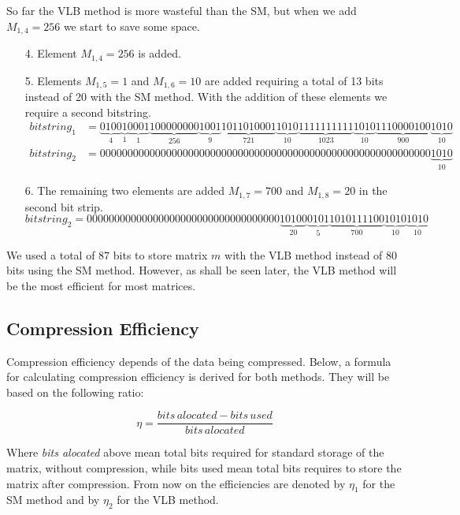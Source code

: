 \documentclass[10pt]{article}
\begin{document}
So far the VLB method is more wasteful than the SM, but when we add $M_{1,4} =256$  we start to save some space.

\begin{enumerate}
 \item[4.] Element $M_{1,4} =256$ is added.  
 \item [5.] Elements $M_{1,5} =1$ and $M_{1,6} =10$ are added requiring a total of 13 bits instead of 20 with the SM method. With the addition of these elements we require a second bitstring.
 \begin{align*} \label{eq:12}
 bitstring_1 &=
 \underbrace{0100}_{4}\underbrace{1}_{1}\underbrace{0001}_{1}\underbrace{100000000}_{256}\underbrace{1001}_{9}\underbrace{1011010001}_{721}\underbrace{1010}_{10}\underbrace{1111111111}_{1023}\underbrace{1010}_{10}\underbrace{1110000100}_{900}\underbrace{1010}_{10} \\
 bitstring_2 &= 000000000000000000000000000000000000000000000000000000000000\underbrace{1010}_{10}
\end{align*}
 \item [6.] The remaining two elements are added $M_{1,7} =700$ and $M_{1,8} =20$ in the second bit strip.
 \begin{equation*} \label{eq:13}
 bitstring_2 = 00000000000000000000000000000000000\underbrace{10100}_{20}\underbrace{0101}_{5}\underbrace{1010111100}_{700}\underbrace{1010}_{10}\underbrace{1010}_{10}
\end{equation*}
\end{enumerate}

 We used a total of 87 bits to store matrix $m$ with the VLB method instead of 80 bits using the SM method. However, as shall be seen later, the VLB method will be the most efficient for most matrices.
 
 \subsection*{Compression Efficiency}
 Compression efficiency depends of the data being compressed. Below, a formula for calculating compression efficiency is derived for both methods. They will be based on the following ratio:
 
 \begin{equation}\label{eq:14}
  \eta=\frac{bits\, alocated-bits\, used}{bits\,alocated}
 \end{equation}
 
 Where \textit{bits alocated} above mean total bits required for standard storage of the matrix, without compression, while bits used mean total bits requires to store the matrix after compression. From now on the efficiencies are denoted by $\eta_1$ for the SM method and by $\eta_2$ for the VLB method. 
\end{document}
